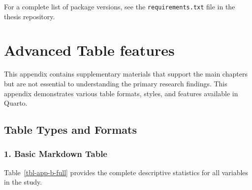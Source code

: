 \documentclass[
  letterpaper,
  oneside,
  openany]{MastersDoctoralThesis}
\theoremstyle{plain}
\theoremstyle{remark}
\begin{document}
For a complete list of package versions, see the
\texttt{requirements.txt} file in the thesis repository.

\chapter{Advanced Table features}\label{sec-app-b}

This appendix contains supplementary materials that support the main
chapters but are not essential to understanding the primary research
findings. This appendix demonstrates various table formats, styles, and
features available in Quarto.

\section{Table Types and Formats}\label{sec-app-b-tables}

\subsection{1. Basic Markdown Table}\label{sec-app-b-basic}

Table~\ref{tbl-app-b-full} provides the complete descriptive statistics
for all variables in the study.
\end{document}
